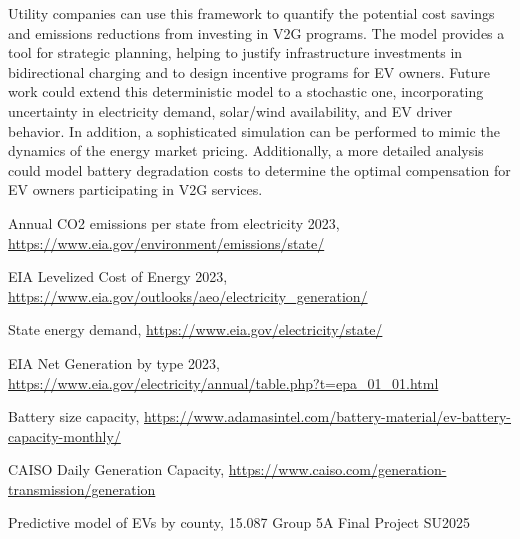 \documentclass[12pt, letterpaper]{article}
\begin{document}
Utility companies can use this framework to quantify the potential cost savings and emissions reductions from investing in V2G programs. The model provides a tool for strategic planning, helping to justify infrastructure investments in bidirectional charging and to design incentive programs for EV owners. Future work could extend this deterministic model to a stochastic one, incorporating uncertainty in electricity demand, solar/wind availability, and EV driver behavior. In addition, a sophisticated simulation can be performed to mimic the dynamics of the energy market pricing. Additionally, a more detailed analysis could model battery degradation costs to determine the optimal compensation for EV owners participating in V2G services.

\begin{thebibliography}{9}
\raggedright

Annual CO2 emissions per state from electricity 2023, \url{https://www.eia.gov/environment/emissions/state/}

EIA Levelized Cost of Energy 2023, \url{https://www.eia.gov/outlooks/aeo/electricity_generation/}

State energy demand, \url{https://www.eia.gov/electricity/state/}

EIA Net Generation by type 2023, \url{https://www.eia.gov/electricity/annual/table.php?t=epa_01_01.html}

Battery size capacity, \url{https://www.adamasintel.com/battery-material/ev-battery-capacity-monthly/}

CAISO Daily Generation Capacity, \url{https://www.caiso.com/generation-transmission/generation}

Predictive model of EVs by county, 15.087 Group 5A Final Project SU2025

\end{thebibliography}
\end{document}
